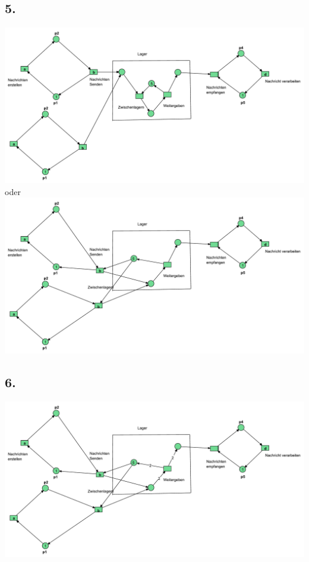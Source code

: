 \documentclass[12pt,a4paper]{article}
\begin{document}
\subsection*{5.}
\includegraphics[scale=0.5]{Teilaufgaben/Aufgabe5.pdf}
\\
oder\\
\includegraphics[scale=0.5]{Teilaufgaben/Aufgabe5Alternativ.pdf}
%
%
\subsection*{6.}
\includegraphics[scale=0.5]{Teilaufgaben/Aufgabe6.pdf}
%
\end{document}
